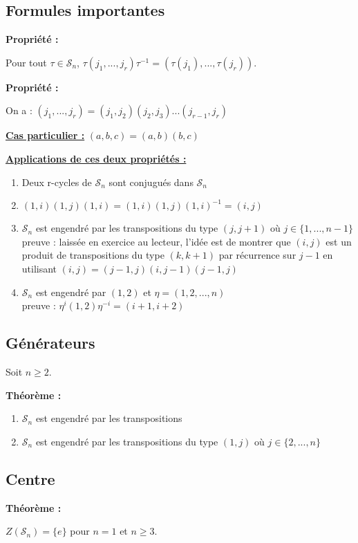 \documentclass{report}
\newenvironment{prop}{\begin{tcolorbox}[colframe= white]
    \textbf{Propriété :}
     \par}
    {\end{tcolorbox}}
\newenvironment{theoreme}[1][]{
    \begin{tcolorbox}[]
    \textbf{Théorème :} #1  \par} 
    {\end{tcolorbox}}
\newcommand{\sn}{\mathcal{S}_{n}}
\begin{document}
\subsection{Formules importantes}
\begin{prop}
Pour tout $\tau\in\sn$, $\tau(j_1,...,j_r)\tau^{-1}=(\tau(j_1),...,\tau(j_r))$.
\end{prop}
\begin{prop}
On a  : $(j_1,...,j_r)=(j_1,j_2)(j_2,j_3)...(j_{r-1},j_r)$
\end{prop}

\noindent\underline{\textbf{Cas particulier :}} $(a,b,c)=(a,b)(b,c)$

\noindent\underline{\textbf{Applications de ces deux propriétés :}}
\begin{enumerate}
\item Deux r-cycles de $\sn$ sont conjugués dans $\sn$
\item $(1, i)(1,j)(1,i)=(1,i)(1,j)(1,i)^{-1}=(i,j)$
\item $\sn$ est engendré par les transpositions du type $(j, j+1)$ où $j\in\{1,...,n-1\}$\\
preuve : laissée en exercice au lecteur, l'idée est de montrer que $(i,j)$ est un produit de transpositions du type $(k,k+1)$ par récurrence sur $j-1$ en utilisant $(i,j)=(j-1,j)(i,j-1)(j-1,j)$
\item $\sn$ est engendré par $(1,2)$ et $\eta=(1,2,...,n)$\\
preuve : $\eta^i(1,2)\eta^{-i}=(i+1,i+2)$
\end{enumerate}

\subsection{Générateurs}
Soit $n \geq 2$.

\begin{theoreme}
\begin{enumerate}
\item $\sn$ est engendré par les transpositions
\item $\sn$ est engendré par les transpositions du type $(1,j)$ où $j\in\{2,...,n\}$
\end{enumerate}
\end{theoreme}

\subsection{Centre}
\begin{theoreme}
$Z(\sn)=\{e\}$ pour $n=1$ et $n\geq3$.
\end{theoreme}
\end{document}
